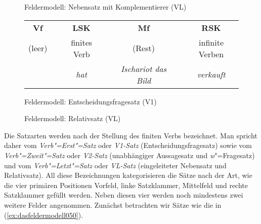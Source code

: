 \begin{figure}[!htbp]
  \caption{Feldermodell: Nebensatz mit Komplementierer (VL)}
  \label{fig:dasfeldermodell047}
\end{figure}

\begin{figure}[!htbp]
    \begin{tabular}{cp{0.1em}cp{0.1em}cp{0.1em}c}
      \textbf{Vf} && \textbf{LSK} && \textbf{Mf} && \textbf{RSK} \\
      \cmidrule{1-1}\cmidrule{3-3}\cmidrule{5-5}\cmidrule{7-7}
      (leer) && finites Verb && (Rest) && infinite Verben \\
      && \textit{hat} && \textit{Ischariot das Bild} && \textit{verkauft} \\
    \end{tabular}
  \caption{Feldermodell: Entscheidungsfragesatz (V1)}
  \label{fig:dasfeldermodell048}
\end{figure}

\begin{figure}[!htbp]
  \caption{Feldermodell: Relativsatz (VL)}
  \label{fig:dasfeldermodell049}
\end{figure}


Die Satzarten werden nach der Stellung des finiten Verbs bezeichnet.
Man spricht daher vom \textit{Verb"=Erst"=Satz} oder \textit{V1-Satz} (Entscheidungsfragesatz) sowie vom \textit{Verb"=Zweit"=Satz} oder \textit{V2-Satz} (unabhängiger Aussagesatz und \textit{w}"=Fragesatz) und vom \textit{Verb"=Letzt"=Satz} oder \textit{VL-Satz} (eingeleiteter Nebensatz und Relativsatz).
All diese Bezeichnungen kategorisieren die Sätze nach der Art, wie die vier primären Positionen Vorfeld, linke Satzklammer, Mittelfeld und rechte Satzklammer gefüllt werden.
Neben diesen vier werden noch mindestens zwei weitere Felder angenommen.
Zunächst betrachten wir Sätze wie die in (\ref{ex:dasfeldermodell050}).

